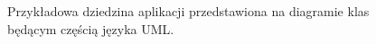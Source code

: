 \begin{figure}[!ht]
\begin{center}
\end{center}

\caption{Przykładowa dziedzina aplikacji przedstawiona na diagramie klas będącym częścią języka UML.}
\label{fig:implementation_core:uml}
\end{figure}
